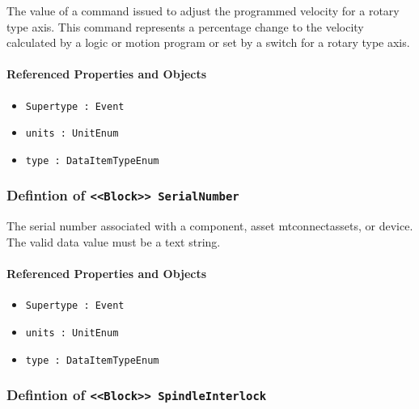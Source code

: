 \FloatBarrier

The value of a command issued to adjust the programmed velocity for a rotary type axis.
 This command represents a percentage change to the velocity calculated by a logic or motion program or set by a switch for a rotary type axis.

\FloatBarrier
\paragraph{Referenced Properties and Objects}

\begin{itemize}
\item \texttt{Supertype : Event}

\item \texttt{units : UnitEnum}

\item \texttt{type : DataItemTypeEnum}

\end{itemize}
\FloatBarrier
\subsubsection{Defintion of \texttt{<<Block>> SerialNumber}}
  \label{type:SerialNumber}

\FloatBarrier

The serial number associated with a component, asset mtconnectassets, or device. The valid data value must be a text string.

\FloatBarrier
\paragraph{Referenced Properties and Objects}

\begin{itemize}
\item \texttt{Supertype : Event}

\item \texttt{units : UnitEnum}

\item \texttt{type : DataItemTypeEnum}

\end{itemize}
\FloatBarrier
\subsubsection{Defintion of \texttt{<<Block>> SpindleInterlock}}
  \label{type:SpindleInterlock}

